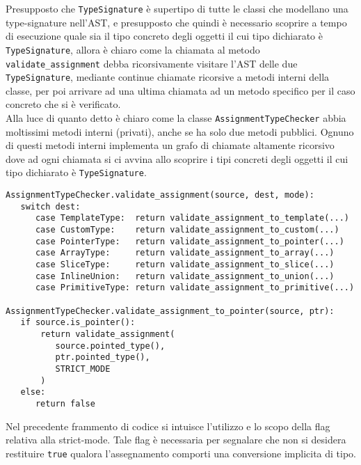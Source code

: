\newpage

Presupposto che \texttt{TypeSignature} è supertipo di tutte le classi che modellano una type-signature nell'AST, e presupposto che 
quindi è necessario scoprire a tempo di esecuzione quale sia il tipo concreto degli oggetti il cui tipo dichiarato è \texttt{TypeSignature},
allora è chiaro come la chiamata al metodo \texttt{validate\_assignment} debba ricorsivamente visitare l'AST delle due \texttt{TypeSignature},
mediante continue chiamate ricorsive a metodi interni della classe, per poi arrivare ad una ultima chiamata ad un metodo specifico per 
il caso concreto che si è verificato. \\

Alla luce di quanto detto è chiaro come la classe \texttt{AssignmentTypeChecker} abbia moltissimi metodi interni (privati), anche se 
ha solo due metodi pubblici. Ognuno di questi metodi interni implementa un grafo di chiamate altamente ricorsivo dove ad ogni chiamata 
si ci avvina allo scoprire i tipi concreti degli oggetti il cui tipo dichiarato è \texttt{TypeSignature}. \\

\begin{lstlisting}[frame=single]
AssignmentTypeChecker.validate_assignment(source, dest, mode):
   switch dest:
      case TemplateType:  return validate_assignment_to_template(...)
      case CustomType:    return validate_assignment_to_custom(...)
      case PointerType:   return validate_assignment_to_pointer(...)
      case ArrayType:     return validate_assignment_to_array(...)
      case SliceType:     return validate_assignment_to_slice(...)
      case InlineUnion:   return validate_assignment_to_union(...)
      case PrimitiveType: return validate_assignment_to_primitive(...)

AssignmentTypeChecker.validate_assignment_to_pointer(source, ptr):
   if source.is_pointer():
       return validate_assignment(
          source.pointed_type(), 
          ptr.pointed_type(), 
          STRICT_MODE
       )
   else:
      return false
\end{lstlisting}
\vspace{0.5cm}

Nel precedente frammento di codice si intuisce l'utilizzo e lo scopo della flag relativa alla 
strict-mode. Tale flag è necessaria per segnalare che non si desidera restituire \texttt{true}
qualora l'assegnamento comporti una conversione implicita di tipo. \\

